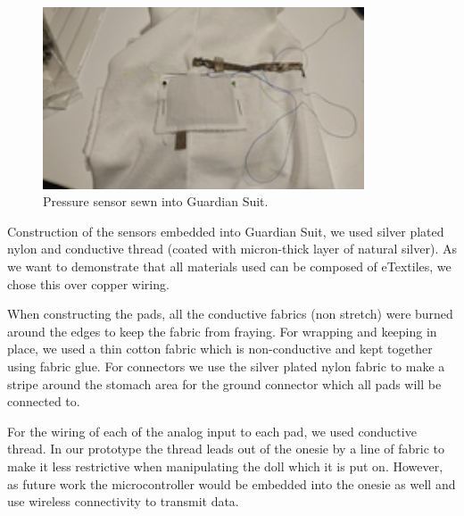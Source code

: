 \documentclass{sigchi-ext}
\begin{document}
{{\begin{minipage}{0.925\marginparwidth}
\begin{figure} [H]
\end{figure}
      \begin{figure} [H]
   \centering \includegraphics[width=0.85\textwidth]{img/resize/w200/pe_integration.JPG}
    \caption{Pressure sensor sewn into Guardian Suit.}
\end{figure}
    \end{minipage}}\label{sec:sidebar3} }

Construction of the sensors embedded into Guardian Suit, we used 
silver plated nylon and conductive thread (coated with micron-thick layer of 
natural silver). As we want to demonstrate that all materials used can be
composed of eTextiles, we chose this over copper wiring.

When constructing the pads, all the conductive fabrics (non stretch) were
burned around the edges to keep the fabric from fraying.
For wrapping and keeping in place, we used a thin cotton
fabric which is non-conductive and kept together using
fabric glue.
For connectors we use the silver plated nylon fabric to make a stripe around
the stomach area for the ground connector  which all pads will be connected to.

For the wiring of each of the analog input to each pad, we used conductive
thread. In our prototype the thread leads out of the onesie by a line of
fabric to make it less restrictive when manipulating the doll which it is
put on. However, as future work the microcontroller would be embedded into
the onesie as well and use wireless connectivity to transmit data.
\end{document}
